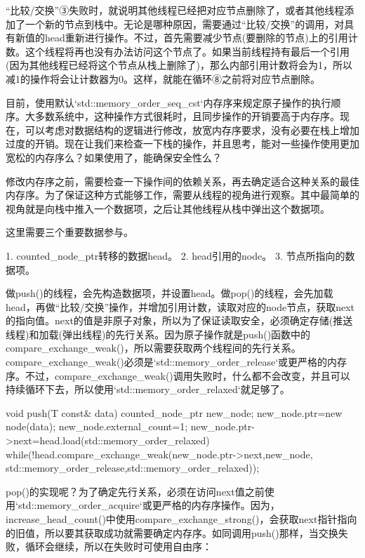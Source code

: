“比较/交换”③失败时，就说明其他线程已经把对应节点删除了，或者其他线程添加了一个新的节点到栈中。无论是哪种原因，需要通过“比较/交换”的调用，对具有新值的head重新进行操作。不过，首先需要减少节点(要删除的节点)上的引用计数。这个线程将再也没有办法访问这个节点了。如果当前线程持有最后一个引用(因为其他线程已经将这个节点从栈上删除了)，那么内部引用计数将会为1，所以减1的操作将会让计数器为0。这样，就能在循环⑧之前将对应节点删除。

目前，使用默认`std::memory\_order\_seq\_cst`内存序来规定原子操作的执行顺序。大多数系统中，这种操作方式很耗时，且同步操作的开销要高于内存序。现在，可以考虑对数据结构的逻辑进行修改，放宽内存序要求，没有必要在栈上增加过度的开销。现在让我们来检查一下栈的操作，并且思考，能对一些操作使用更加宽松的内存序么？如果使用了，能确保安全性么？


修改内存序之前，需要检查一下操作间的依赖关系，再去确定适合这种关系的最佳内存序。为了保证这种方式能够工作，需要从线程的视角进行观察。其中最简单的视角就是向栈中推入一个数据项，之后让其他线程从栈中弹出这个数据项。

这里需要三个重要数据参与。

1. counted\_node\_ptr转移的数据head。
2. head引用的node。
3. 节点所指向的数据项。

做push()的线程，会先构造数据项，并设置head。做pop()的线程，会先加载head，再做“比较/交换”操作，并增加引用计数，读取对应的node节点，获取next的指向值。next的值是非原子对象，所以为了保证读取安全，必须确定存储(推送线程)和加载(弹出线程)的先行关系。因为原子操作就是push()函数中的compare\_exchange\_weak()，所以需要获取两个线程间的先行关系。compare\_exchange\_weak()必须是`std::memory\_order\_release`或更严格的内存序。不过，compare\_exchange\_weak()调用失败时，什么都不会改变，并且可以持续循环下去，所以使用`std::memory\_order\_relaxed`就足够了。

\begin{cpp}
void push(T const& data)
{
  counted_node_ptr new_node;
  new_node.ptr=new node(data);
  new_node.external_count=1;
  new_node.ptr->next=head.load(std::memory_order_relaxed)
  while(!head.compare_exchange_weak(new_node.ptr->next,new_node,
    std::memory_order_release,std::memory_order_relaxed));
}
\end{cpp}

pop()的实现呢？为了确定先行关系，必须在访问next值之前使用`std::memory\_order\_acquire`或更严格的内存序操作。因为，increase\_head\_count()中使用compare\_exchange\_strong()，会获取next指针指向的旧值，所以要其获取成功就需要确定内存序。如同调用push()那样，当交换失败，循环会继续，所以在失败时可使用自由序：

